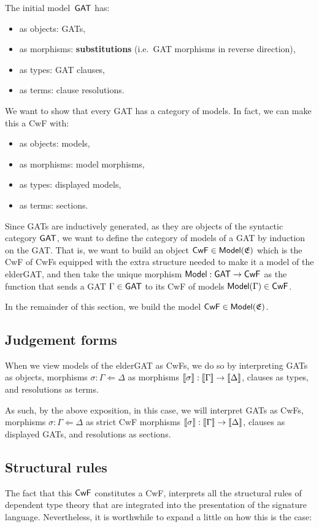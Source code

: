 \documentclass[a4paper]{article}
\begin{document}
The initial model $\,\mathsf{GAT}$ has:
\begin{itemize}[noitemsep]
	\item as objects: GATs,
	\item as morphisms: \textbf{substitutions} (i.e.\ GAT morphisms in reverse direction),
	\item as types: GAT clauses,
	\item as terms: clause resolutions.
\end{itemize}

We want to show that every GAT has a category of models. In fact, we can make this a CwF with:
\begin{itemize}[noitemsep]
	\item as objects: models,
	\item as morphisms: model morphisms,
	\item as types: displayed models,
	\item as terms: sections.
\end{itemize}
Since GATs are inductively generated, as they are objects of the syntactic category ${\mathsf{GAT}}$, we want to define the category of models of a GAT by induction on the GAT.
That is, we want to build an object ${\mathsf{CwF}} \in {\mathsf{Model}}({{\mathfrak{E}}})$ which is the CwF of CwFs equipped with the extra structure needed to make it a model of the elderGAT, and then take the unique morphism ${\mathsf{Model}} : {\mathsf{GAT}} \to {\mathsf{CwF}}$ as the function that sends a GAT $\Gamma \in {\mathsf{GAT}}$ to its CwF of models ${\mathsf{Model}}(\Gamma) \in {\mathsf{CwF}}$.

In the remainder of this section, we build the model ${\mathsf{CwF}} \in {\mathsf{Model}}({{\mathfrak{E}}})$.

\subsection{Judgement forms}
When we view models of the elderGAT as CwFs, we do so by interpreting GATs as objects, morphisms $\sigma : \Gamma \Leftarrow \Delta$ as morphisms $\mathopen{}\left\llbracket \sigma \right\rrbracket\mathclose{} : \mathopen{}\left\llbracket \Gamma \right\rrbracket\mathclose{} \to \mathopen{}\left\llbracket \Delta \right\rrbracket\mathclose{}$, clauses as types, and resolutions as terms.

As such, by the above exposition, in this case, we will interpret GATs as CwFs, morphisms $\sigma : \Gamma \Leftarrow \Delta$ as strict CwF morphisms $\mathopen{}\left\llbracket \sigma \right\rrbracket\mathclose{} : \mathopen{}\left\llbracket \Gamma \right\rrbracket\mathclose{} \to \mathopen{}\left\llbracket \Delta \right\rrbracket\mathclose{}$, clauses as displayed GATs, and resolutions as sections.

\subsection{Structural rules}
The fact that this ${\mathsf{CwF}}$ constitutes a CwF, interprets all the structural rules of dependent type theory that are integrated into the presentation of the signature language.
Nevertheless, it is worthwhile to expand a little on how this is the case:
\end{document}

